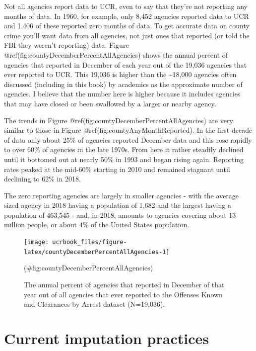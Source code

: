 \documentclass[
  12pt,
  openany]{book}
\begin{document}
Not all agencies report data to UCR, even to say that they're not reporting any months of data. In 1960, for example, only 8,452 agencies reported data to UCR and 1,406 of these reported zero months of data. To get accurate data on county crime you'll want data from all agencies, not just ones that reported (or told the FBI they weren't reporting) data. Figure @ref(fig:countyDecemberPercentAllAgencies) shows the annual percent of agencies that reported in December of each year out of the 19,036 agencies that ever reported to UCR. This 19,036 is higher than the \textasciitilde18,000 agencies often discussed (including in this book) by academics as the approximate number of agencies. I believe that the number here is higher because it includes agencies that may have closed or been swallowed by a larger or nearby agency.

The trends in Figure @ref(fig:countyDecemberPercentAllAgencies) are very similar to those in Figure @ref(fig:countyAnyMonthReported). In the first decade of data only about 25\% of agencies reported December data and this rose rapidly to over 60\% of agencies in the late 1970s. From here it rather steadily declined until it bottomed out at nearly 50\% in 1993 and began rising again. Reporting rates peaked at the mid-60\% starting in 2010 and remained stagnant until declining to 62\% in 2018.

The zero reporting agencies are largely in smaller agencies - with the average sized agency in 2018 having a population of 1,682 and the largest having a population of 463,545 - and, in 2018, amounts to agencies covering about 13 million people, or about 4\% of the United States population.

\begin{figure}

{\centering \texttt{[image: ucrbook\_files/figure-latex/countyDecemberPercentAllAgencies-1]} 

}

\caption{The annual percent of agencies that reported in December of that year out of all agencies that ever reported to the Offenses Known and Clearances by Arrest dataset (N=19,036).}(\#fig:countyDecemberPercentAllAgencies)
\end{figure}

\hypertarget{current-imputation-practices}{%
\section{Current imputation practices}\label{current-imputation-practices}}
\end{document}
